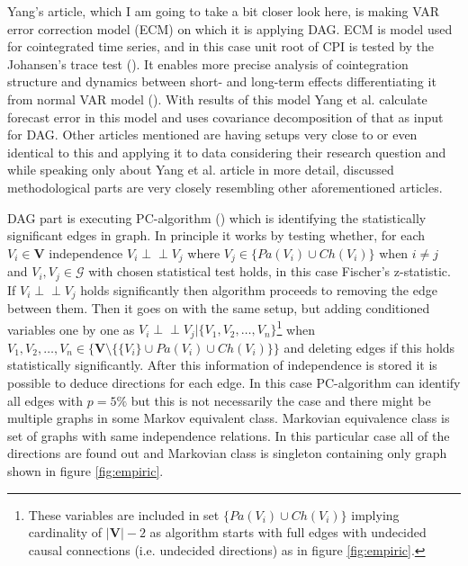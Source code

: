 \documentclass[main=english,12pt,a4paper,pdftex,econ,utf8]{aaltothesis}
\newcommand{\indep}{\perp \!\!\! \perp}
\newcommand{\ch}[1]{Ch(#1)}
\newcommand{\pa}[1]{Pa(#1)}
\newcommand{\g}{\mathcal{G}}
\newcommand{\vars}{\bm{V}}
\begin{document}


Yang's article, which I am going to take a bit closer look here, is making VAR error correction model (ECM) on which it is applying DAG. ECM is model used for cointegrated time series, and in this case unit root of CPI is tested by the Johansen's trace test (\cite{Johansen1991}). It enables more precise analysis of cointegration structure and dynamics between short- and long-term effects differentiating it from normal VAR model (\cite{lütkepohl_krätzig_2004}). With results of this model Yang et al. calculate forecast error in this model and uses covariance decomposition of that as input for DAG. Other articles mentioned are having setups very close to or even identical to this and applying it to data considering their research question and while speaking only about Yang et al. article in more detail, discussed methodological parts are very closely resembling other aforementioned articles.

DAG part is executing PC-algorithm (\cite{Spirtes2000}) which is identifying the statistically significant edges in graph. In principle it works by testing whether, for each $V_{i}\in\vars$ independence $V_{i}\indep V_{j}$ where $V_{j}\in\{\pa{V_{i}}\cup\ch{V_{i}}\}$
when $i\neq j$ and $V_{i},V_{j}\in\g$ with chosen statistical test holds, in this case Fischer's z-statistic. If $V_{i}\indep V_{j}$ holds significantly then algorithm proceeds to removing the edge between them. Then it goes on with the same setup, but adding conditioned variables one by one as $V_{i}\indep V_{j}|\{V_{1},V_{2},\ldots,V_{n}\}$\footnote{These variables are included in set $\{\pa{V_{i}}\cup\ch{V_{i}}\}$ implying cardinality of $|\vars|-2$ as algorithm starts with full edges with undecided causal connections (i.e. undecided directions) as in figure \ref{fig:empiric}.} when $V_{1},V_{2},\ldots,V_{n}\in\{\vars\setminus\{\{V_{i}\}\cup\pa{V_{i}}\cup\ch{V_{i}}\}\}$ and deleting edges if this holds statistically significantly. After this information of independence is stored it is possible to deduce directions for each edge. In this case PC-algorithm can identify all edges with $p=5\%$ but this is not necessarily the case and there might be multiple graphs in some Markov equivalent class. Markovian equivalence class is set of graphs with same independence relations. In this particular case all of the directions are found out and Markovian class is singleton containing only graph shown in figure \ref{fig:empiric}.

\end{document}
